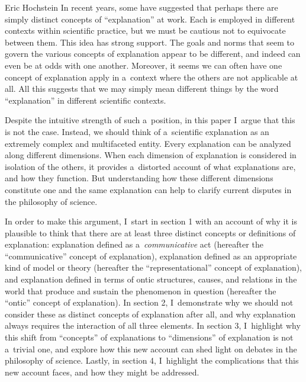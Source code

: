 \begin{artengenv}{Eric Hochstein}
In recent years, some have suggested that perhaps there are simply distinct concepts of ``explanation'' at work. Each is employed in different contexts within scientific practice, but we must be cautious not to equivocate between them. This idea has strong support. The goals and norms that seem to govern the various concepts of explanation appear to be different, and indeed can even be at odds with one another. Moreover, it seems we can often have one concept of explanation apply in a~context where the others are not applicable at all. All this suggests that we may simply mean different things by the word ``explanation'' in different scientific contexts.

Despite the intuitive strength of such a~position, in this paper I~argue that this is not the case. Instead, we should think of a~scientific explanation as an extremely complex and multifaceted entity. Every explanation can be analyzed along different dimensions. When each dimension of explanation is considered in isolation of the others, it provides a~distorted account of what explanations are, and how they function. But understanding how these different dimensions constitute one and the same explanation can help to clarify current disputes in the philosophy of science.

In order to make this argument, I~start in section 1 with an account of why it is plausible to think that there are at least three distinct concepts or definitions of explanation: explanation defined as a~\textit{communicative} act (hereafter the ``communicative'' concept of explanation), explanation defined as an appropriate kind of model or theory (hereafter the ``representational'' concept of explanation), and explanation defined in terms of ontic structures, causes, and relations in the world that produce and sustain the phenomenon in question (hereafter the ``ontic'' concept of explanation). In section 2, I~demonstrate why we should not consider these as distinct concepts of explanation after all, and why explanation always requires the interaction of all three elements. In section 3, I~highlight why this shift from ``concepts'' of explanations to ``dimensions'' of explanation is not a~trivial one, and explore how this new account can shed light on debates in the philosophy of science. Lastly, in section 4, I~highlight the complications that this new account faces, and how they might be addressed.


\end{artengenv}
